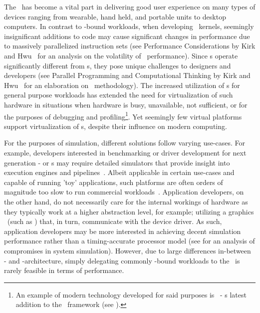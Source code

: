 The \dvttermgpu\ has become a vital part in delivering good user experience on many types of devices ranging from wearable, hand held, and portable units to desktop computers.
In contrast to \dvttermcpu -bound workloads, when developing \dvttermgpu\ kernels, seemingly insignificant additions to code may cause significant changes in performance due to massively parallelized instruction sets (see Performance Considerations by Kirk and Hwu~ for an analysis on the volatility of \dvttermgpu\ performance).
Since \dvttermgpu s operate significantly different from \dvttermcpu s, they pose unique challenges to designers and developers (see Parallel Programming and Computational Thinking by Kirk and Hwu~ for an elaboration on \dvttermgpgpu\ methodology).
The increased utilization of \dvttermgpu s for general purpose workloads has extended the need for virtualization of such hardware in situations when hardware is busy, unavailable, not sufficient, or for the purposes of debugging and profiling\footnote{An example of modern technology developed for said purposes is \dvttermwarp\ - \dvttermmicrosoft s latest addition to the \dvttermdirectx\ framework (see ).}.
Yet seemingly few virtual platforms support virtualization of \dvttermgpu s, despite their influence on modern computing.

For the purposes of simulation, different solutions follow varying use-cases. For example, developers interested in benchmarking or driver development for next generation \dvttermgpu - or \dvttermcpu s may require detailed simulators that provide insight into execution engines and pipelines~.
Albeit applicable in certain use-cases and capable of running 'toy' applications, such platforms are often orders of magnitude too slow to run commercial workloads~.
Application developers, on the other hand, do not necessarily care for the internal workings of hardware as they typically work at a higher abstraction level, for example; utilizing a graphics \dvttermapi\ (such as \dvttermopengl ) that, in turn, communicate with the device driver.
As such, application developers may be more interested in achieving decent simulation performance rather than a timing-accurate processor model (see  for an analysis of compromises in system simulation).
However, due to large differences in-between \dvttermcpu - and \dvttermgpu -architecture, simply delegating commonly \dvttermgpu -bound workloads to the \dvttermcpu\ is rarely feasible in terms of performance.

